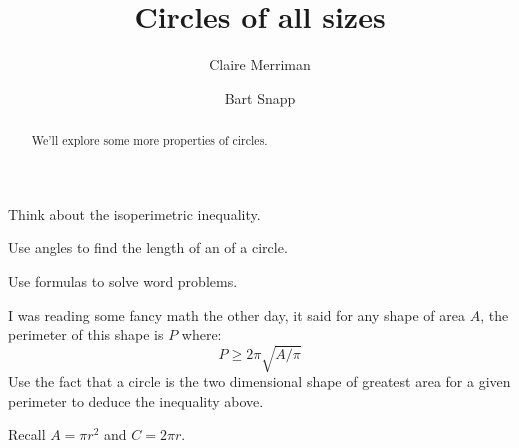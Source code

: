 \documentclass[noauthor,hints,nooutcomes,handout]{ximera}
\title{Circles of all sizes}
\author{Claire Merriman \and Bart Snapp}
\begin{document}
\begin{abstract}
  We'll explore some more properties of circles.
\end{abstract}
\maketitle

\begin{listOutcomes}
  \item Think about the isoperimetric inequality.
\item Use angles to find the length of an of a circle.
\item Use formulas to solve word problems.
\end{listOutcomes}



\mynewpage

\begin{question}
  I was reading some fancy math the other day, it said for any shape
  of area $A$, the perimeter of this shape is $P$ where:
  \[
  P \ge 2\pi\sqrt{A/\pi}
  \]
  Use the fact that a circle is the two dimensional shape of greatest
  area for a given perimeter to deduce the inequality above.
  \begin{hint} Recall $A = \pi r^2$ and $C = 2\pi r$.
  \end{hint}
\end{question}
\mynewpage
\end{document}
